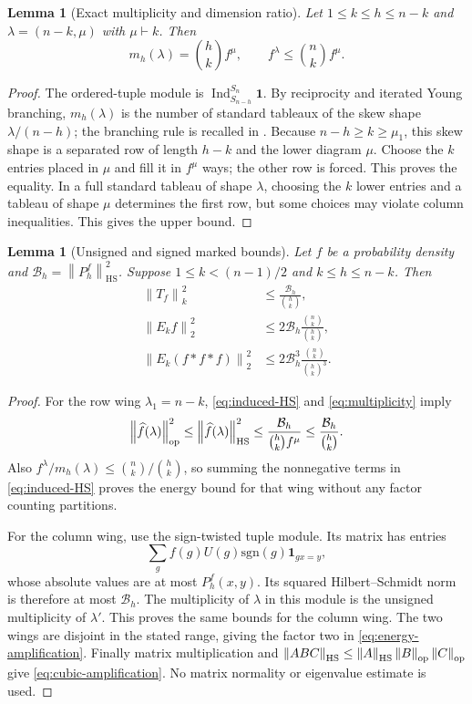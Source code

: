 \documentclass[11pt]{article}
\numberwithin{equation}{section}
\newtheorem{lemma}[theorem]{Lemma}
\theoremstyle{definition}\newtheorem{definition}[theorem]{Definition}
\theoremstyle{remark}\newtheorem{remark}[theorem]{Remark}
\newcommand{\ind}{\mathbf 1}
\newcommand{\sgn}{\mathrm{sgn}}
\newcommand{\HS}{\mathrm{HS}}
\newcommand{\norm}[1]{\left\lVert#1\right\rVert}
\begin{document}
\begin{lemma}[Exact multiplicity and dimension ratio]\label{lem:multiplicity}
Let $1\le k\le h\le n-k$ and $\lambda=(n-k,\mu)$ with $\mu\vdash k$.
Then
\begin{equation}\label{eq:multiplicity}
 m_h(\lambda)=\binom hk f^\mu,
 \qquad f^\lambda\le\binom nk f^\mu.
\end{equation}
\end{lemma}
\begin{proof}
The ordered-tuple module is $\operatorname{Ind}_{S_{n-h}}^{S_n}\mathbf1$.
By reciprocity and iterated Young branching, $m_h(\lambda)$ is the number
of standard tableaux of the skew shape $\lambda/(n-h)$; the branching
rule is recalled in \cite[Section 2.2]{KeevashLifshitz2023}. Because $n-h\ge k\ge\mu_1$,
this skew shape is a separated row of length $h-k$ and the lower diagram
$\mu$. Choose the $k$ entries placed in $\mu$ and fill it in $f^\mu$ ways;
the other row is forced. This proves the equality. In a full standard
tableau of shape $\lambda$, choosing the $k$ lower entries and a tableau
of shape $\mu$ determines the first row, but some choices may violate
column inequalities. This gives the upper bound.
\end{proof}

\begin{lemma}[Unsigned and signed marked bounds]\label{lem:HS-amplification}
Let $f$ be a probability density and
$\mathcal B_h=\norm{P_h^f}_\HS^2$. Suppose
$1\le k<(n-1)/2$ and $k\le h\le n-k$. Then
\begin{align}
 \norm{T_f}_k^2
 &\le\frac{\mathcal B_h}{\binom hk},\label{eq:op-amplification}\\
 \norm{E_k f}_2^2
 &\le2\mathcal B_h\frac{\binom nk}{\binom hk},\label{eq:energy-amplification}\\
 \norm{E_k(f*f*f)}_2^2
 &\le2\mathcal B_h^3\frac{\binom nk}{\binom hk^3}.
 \label{eq:cubic-amplification}
\end{align}
\end{lemma}
\begin{proof}
For the row wing $\lambda_1=n-k$, \eqref{eq:induced-HS} and
\eqref{eq:multiplicity} imply
\[
 \norm{\widehat f(\lambda)}_{\rm op}^2
 \le\norm{\widehat f(\lambda)}_\HS^2
 \le\frac{\mathcal B_h}{\binom hk f^\mu}
 \le\frac{\mathcal B_h}{\binom hk}.
\]
Also $f^\lambda/m_h(\lambda)\le\binom nk/\binom hk$, so summing the
nonnegative terms in \eqref{eq:induced-HS} proves the energy bound for
that wing without any factor counting partitions.

For the column wing, use the sign-twisted tuple module. Its matrix has
entries
\[
 \sum_g f(g)U(g)\sgn(g)\ind_{g x=y},
\]
whose absolute values are at most $P_h^f(x,y)$. Its squared Hilbert--Schmidt norm is therefore at
most $\mathcal B_h$. The multiplicity of $\lambda$ in this module is the
unsigned multiplicity of $\lambda'$. This proves the same bounds for
the column wing. The two wings are disjoint in the stated range, giving
the factor two in \eqref{eq:energy-amplification}.
Finally matrix multiplication and
$\norm{ABC}_\HS\le\norm A_\HS\norm B_{\rm op}\norm C_{\rm op}$ give
\eqref{eq:cubic-amplification}. No matrix normality or eigenvalue estimate
is used.
\end{proof}
\end{document}
